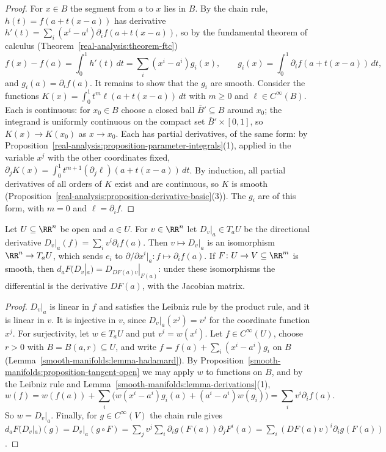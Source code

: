 \begin{proof}
For $x \in B$ the segment from $a$ to $x$ lies in $B$. By the chain rule, $h(t) = f(a + t(x - a))$ has derivative
$h'(t) = \sum_i(x^i - a^i)\partial_if(a + t(x - a))$, so by the fundamental theorem of calculus (Theorem~\ref{real-analysis:theorem-ftc})
\[
f(x) - f(a) = \int_0^1h'(t)\,dt = \sum_i(x^i - a^i)g_i(x), \qquad g_i(x) = \int_0^1\partial_if(a + t(x - a))\,dt,
\]
and $g_i(a) = \partial_if(a)$. It remains to show that the $g_i$ are smooth. Consider the functions $K(x) = \int_0^1t^m\ell(a + t(x - a))\,dt$ with $m \geq 0$
and $\ell \in C^\infty(B)$. Each is continuous: for $x_0 \in B$ choose a closed ball $\overline{B}' \subseteq B$ around $x_0$; the integrand is uniformly
continuous on the compact set $\overline{B}' \times [0, 1]$, so $K(x) \to K(x_0)$ as $x \to x_0$. Each has partial derivatives, of the same form: by
Proposition~\ref{real-analysis:proposition-parameter-integrals}(1), applied in the variable $x^j$ with the other coordinates fixed,
$\partial_jK(x) = \int_0^1t^{m+1}(\partial_j\ell)(a + t(x - a))\,dt$. By induction, all partial derivatives of all orders of $K$ exist and are continuous, so $K$
is smooth (Proposition~\ref{real-analysis:proposition-derivative-basic}(3)). The $g_i$ are of this form, with $m = 0$ and $\ell = \partial_if$.
\end{proof}

\begin{proposition}\label{smooth-manifolds:proposition-tangent-euclidean}
Let $U \subseteq \RR^n$ be open and $a \in U$. For $v \in \RR^n$ let $D_v|_a \in T_aU$ be the directional derivative
$D_v|_a(f) = \sum_iv^i\partial_if(a)$. Then $v \mapsto D_v|_a$ is an isomorphism $\RR^n \to T_aU$, which sends $e_i$ to
$\partial/\partial x^i|_a \colon f \mapsto \partial_if(a)$. If $F \colon U \to V \subseteq \RR^m$ is smooth, then $d_aF(D_v|_a) = D_{DF(a)v}|_{F(a)}$: under these
isomorphisms the differential is the derivative $DF(a)$, with the Jacobian matrix.
\end{proposition}

\begin{proof}
$D_v|_a$ is linear in $f$ and satisfies the Leibniz rule by the product rule, and it is linear in $v$. It is injective in $v$, since $D_v|_a(x^j) = v^j$ for the
coordinate function $x^j$. For surjectivity, let $w \in T_aU$ and put $v^i = w(x^i)$. Let $f \in C^\infty(U)$, choose $r > 0$ with $B = B(a, r) \subseteq U$, and
write $f = f(a) + \sum_i(x^i - a^i)g_i$ on $B$ (Lemma~\ref{smooth-manifolds:lemma-hadamard}). By Proposition~\ref{smooth-manifolds:proposition-tangent-open} we
may apply $w$ to functions on $B$, and by the Leibniz rule and Lemma~\ref{smooth-manifolds:lemma-derivations}(1),
\[
w(f) = w(f(a)) + \sum_i\bigl(w(x^i - a^i)g_i(a) + (a^i - a^i)w(g_i)\bigr) = \sum_iv^i\partial_if(a).
\]
So $w = D_v|_a$. Finally, for $g \in C^\infty(V)$ the chain rule gives
$d_aF(D_v|_a)(g) = D_v|_a(g \circ F) = \sum_j v^j\sum_i\partial_ig(F(a))\partial_jF^i(a) = \sum_i(DF(a)v)^i\partial_ig(F(a))$.
\end{proof}

